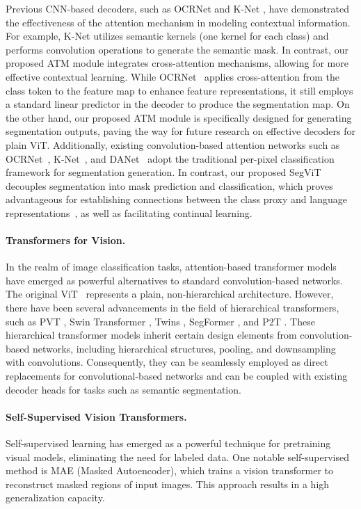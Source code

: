 Previous CNN-based decoders, such as OCRNet \cite{yuan2019segmentation} and K-Net \cite{zhang2021k}, have demonstrated the effectiveness of the attention mechanism in modeling contextual information. For example, K-Net utilizes semantic kernels (one kernel for each class) and performs convolution operations to generate the semantic mask. In contrast, our proposed ATM module integrates cross-attention mechanisms, allowing for more effective contextual learning. While OCRNet~\cite{yuan2019segmentation} applies cross-attention from the class token to the feature map to enhance feature representations, it still employs a standard linear predictor in the decoder to produce the segmentation map. On the other hand, our proposed ATM module is specifically designed for generating segmentation outputs, paving the way for future research on effective decoders for plain ViT. Additionally, existing convolution-based attention networks such as OCRNet~\cite{yuan2019segmentation}, K-Net~\cite{zhang2021k}, and DANet~\cite{danet} adopt the traditional per-pixel classification framework for segmentation generation. In contrast, our proposed SegViT decouples segmentation into mask prediction and classification, which proves advantageous for establishing connections between the class proxy and language representations~\cite{zhou2022zegclip}, as well as facilitating continual learning.  


\paragraph{Transformers for Vision.}
In the realm of image classification tasks, attention-based transformer models have emerged as powerful alternatives to standard convolution-based networks. The original ViT~\cite{vit} represents a plain, non-hierarchical architecture. However, there have been several advancements in the field of hierarchical transformers, such as PVT \cite{pvt}, Swin Transformer \cite{liu2021swin}, Twins \cite{chu2021twins}, SegFormer \cite{xie2021segformer}, and P2T \cite{p2t}.
These hierarchical transformer models inherit certain design elements from convolution-based networks, including hierarchical structures, pooling, and downsampling with convolutions. Consequently, they can be seamlessly employed as direct replacements for convolutional-based networks and can be coupled with existing decoder heads for tasks such as semantic segmentation.

\paragraph{Self-Supervised Vision Transformers.} Self-supervised learning has emerged as a powerful te\-ch\-ni\-q\-u\-e for pre\-tr\-ain\-ing visual models, eliminating the need for labeled data. One notable self-supervised method is MAE \cite{he2022masked} (Masked Autoencoder), which trains a vision transformer to reconstruct masked regions of input images. This approach results in a high generalization capacity. 

